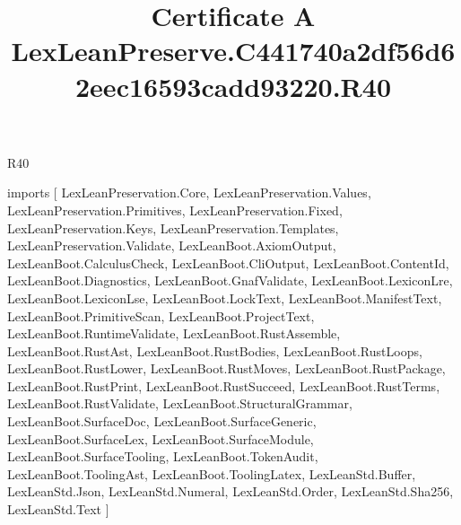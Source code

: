 \begin{lexlean}{R40}
\title{Certificate A LexLeanPreserve.C441740a2df56d62eec16593cadd93220.R40}
\begin{coremodule}
imports [
  LexLeanPreservation.Core,
  LexLeanPreservation.Values,
  LexLeanPreservation.Primitives,
  LexLeanPreservation.Fixed,
  LexLeanPreservation.Keys,
  LexLeanPreservation.Templates,
  LexLeanPreservation.Validate,
  LexLeanBoot.AxiomOutput,
  LexLeanBoot.CalculusCheck,
  LexLeanBoot.CliOutput,
  LexLeanBoot.ContentId,
  LexLeanBoot.Diagnostics,
  LexLeanBoot.GnafValidate,
  LexLeanBoot.LexiconLre,
  LexLeanBoot.LexiconLse,
  LexLeanBoot.LockText,
  LexLeanBoot.ManifestText,
  LexLeanBoot.PrimitiveScan,
  LexLeanBoot.ProjectText,
  LexLeanBoot.RuntimeValidate,
  LexLeanBoot.RustAssemble,
  LexLeanBoot.RustAst,
  LexLeanBoot.RustBodies,
  LexLeanBoot.RustLoops,
  LexLeanBoot.RustLower,
  LexLeanBoot.RustMoves,
  LexLeanBoot.RustPackage,
  LexLeanBoot.RustPrint,
  LexLeanBoot.RustSucceed,
  LexLeanBoot.RustTerms,
  LexLeanBoot.RustValidate,
  LexLeanBoot.StructuralGrammar,
  LexLeanBoot.SurfaceDoc,
  LexLeanBoot.SurfaceGeneric,
  LexLeanBoot.SurfaceLex,
  LexLeanBoot.SurfaceModule,
  LexLeanBoot.SurfaceTooling,
  LexLeanBoot.TokenAudit,
  LexLeanBoot.ToolingAst,
  LexLeanBoot.ToolingLatex,
  LexLeanStd.Buffer,
  LexLeanStd.Json,
  LexLeanStd.Numeral,
  LexLeanStd.Order,
  LexLeanStd.Sha256,
  LexLeanStd.Text
]


\end{coremodule}
\end{lexlean}
